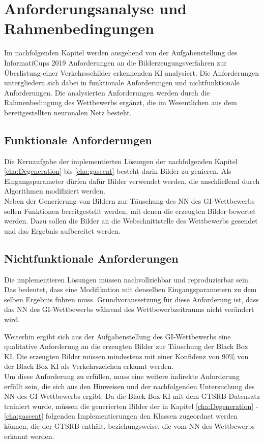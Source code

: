 \chapter{Anforderungsanalyse und Rahmenbedingungen}
\label{cha:AnfAnalyse}

Im nachfolgenden Kapitel werden ausgehend von der Aufgabenstellung des InformatiCups 2019 Anforderungen an die Bilderzeugungsverfahren zur Überlistung einer Verkehrsschilder erkennenden \ac{KI} analysiert. Die Anforderungen untergliedern sich dabei in funktionale Anforderungen und nichtfunktionale Anforderungen. Die analysierten Anforderungen werden durch die Rahmenbedingung des Wettbewerbs ergänzt, die im Wesentlichen aus dem bereitgestellten neuronalen Netz besteht.

\section{Funktionale Anforderungen}
Die Kernaufgabe der implementierten Lösungen der nachfolgenden Kapitel \ref{cha:Degeneration} bis \ref{cha:gascent} besteht darin Bilder zu genieren. Als Eingangsparameter dürfen dafür Bilder verwendet werden, die anschließend durch Algorithmen modifiziert werden.\\
Neben der Generierung von Bildern zur Täuschung des \ac{NN} des \ac{GI}-Wettbewerbs sollen Funktionen bereitgestellt werden, mit denen die erzeugten Bilder bewertet werden. Dazu sollen die Bilder an die Webschnittstelle des Wettbewerbs gesendet und das Ergebnis aufbereitet werden.

\section{Nichtfunktionale Anforderungen}
Die implementieren Lösungen müssen nachvollziehbar und reproduzierbar sein. Das bedeutet, dass eine Modifikation mit denselben Eingangsparametern zu dem selben Ergebnis führen muss. Grundvoraussetzung für diese Anforderung ist, dass das \ac{NN} des \ac{GI}-Wettbewerbs während des Wettbewerbzeitraums nicht verändert wird.

Weiterhin ergibt sich aus der Aufgabenstellung des \ac{GI}-Wettbewerbs eine qualitative Anforderung an die erzeugten Bilder zur Täuschung der Black Box \ac{KI}. Die erzeugten Bilder müssen mindestens mit einer Konfidenz von 90\% von der Black Box \ac{KI} als Verkehrszeichen erkannt werden. \cite{gesellschaft_fur_informatik_e.v._informaticup2019-irrbilder.pdf_2018} \\
Um diese Anforderung zu erfüllen, muss eine weitere indirekte Anforderung erfüllt sein, die sich aus den Hinweisen und der nachfolgenden Untersuchung des \ac{NN} des \ac{GI}-Wettbewerbs ergibt. Da die Black Box \ac{KI} mit dem \ac{GTSRB} Datensatz trainiert wurde, müssen die generierten Bilder der in Kapitel \ref{cha:Degeneration} - \ref{cha:gascent} folgenden Implementierungen den Klassen zugeordnet werden können, die der \ac{GTSRB} enthält, beziehungsweise, die vom \ac{NN} des Wettbewerbs erkannt werden. 


